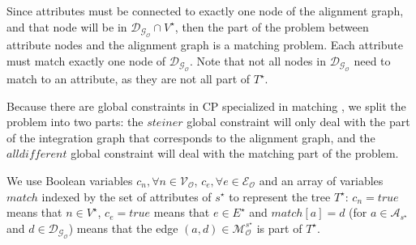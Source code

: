 \documentclass[letterpaper]{article} %
\newcommand{\forijcai}[1]{}
\begin{document}
Since attributes must be connected to exactly one node of the alignment 
graph, and that node will be in $\mathcal{D_{G_O}} \cap V^\star$, 
then the part of the problem between attribute nodes and the alignment graph is 
\forijcai{actually} a matching problem. Each attribute must match exactly one node of 
$\mathcal{D_{G_O}}$. Note that not all nodes in $\mathcal{D_{G_O}}$ need to match 
to an attribute, as they are not all part of $T^\star$.

Because there are global constraints in CP specialized in matching 
\cite{regin1994filtering}, we split the problem into two parts: the 
$\mathit{steiner}$ global constraint \cite{deuna2016steiner} will only deal with the part of the 
integration graph that corresponds to the alignment graph, and the 
$\mathit{alldifferent}$ global constraint will deal with the matching part of 
the problem.

We use Boolean 
variables $c_n,\forall n \in 
\mathcal{V_O}$, $c_e, \forall e \in	\mathcal{E_O}$ and an array of variables 
$match$ indexed by the set of attributes of $s^\star$ to represent the tree $T^\star$: $c_n = \mathit{true}$ means 
that $n \in V^\star$, $c_e = \mathit{true}$ means that $e \in E^\star$ and 
$match[a] = d$ (for $a \in \mathcal{A}_{s^\star}$ and $d \in 
\mathcal{D_{G_O}}$) means that the edge $(a,d) \in 
\mathcal{M}_\mathcal{O}^{s^\star}$ is part of $T^\star$.
\end{document}
